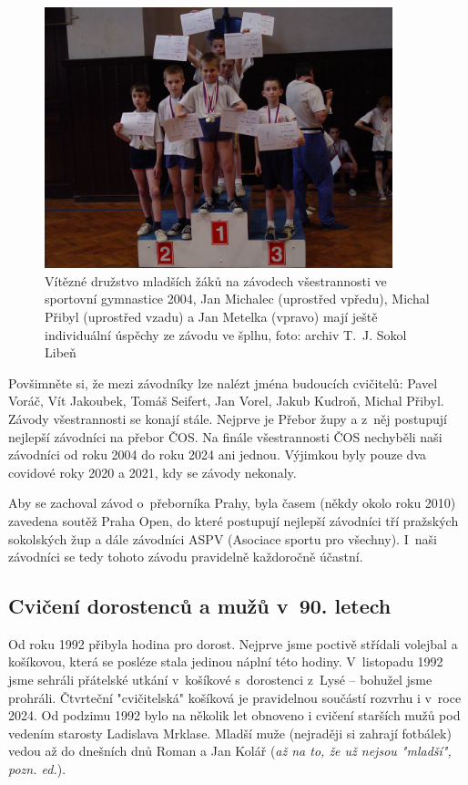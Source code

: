 \documentclass[a5paper, 11pt, twoside]{article}
\begin{document}
\begin{figure}[h!]
  \centering 
  \includegraphics[width=0.9\textwidth]{img/42_vitezove_gumnastika.JPG}
  \caption*{Vítězné družstvo mladších žáků na závodech všestrannosti ve
  sportovní gymnastice 2004, Jan Michalec (uprostřed vpředu), Michal
  Přibyl (uprostřed vzadu) a Jan Metelka (vpravo) mají ještě individuální
  úspěchy ze závodu ve šplhu, foto: archiv T.~J. Sokol Libeň}
\end{figure}

Povšimněte si, že mezi závodníky lze nalézt jména budoucích cvičitelů:
Pavel Voráč, Vít Jakoubek, Tomáš Seifert, Jan Vorel, Jakub Kudroň,
Michal Přibyl. Závody všestrannosti se konají stále. Nejprve je Přebor
župy a z~něj postupují nejlepší závodníci na přebor ČOS. Na finále
všestrannosti ČOS nechyběli naši závodníci od roku 2004 do roku 2024 ani
jednou. Výjimkou byly pouze dva covidové roky 2020 a 2021, kdy se závody
nekonaly.

Aby se zachoval závod o~přeborníka Prahy, byla časem (někdy okolo roku
2010) zavedena soutěž Praha Open, do které postupují nejlepší závodníci
tří pražských sokolských žup a dále závodníci ASPV (Asociace sportu pro
všechny). I~naši závodníci se tedy tohoto závodu pravidelně každoročně
účastní.

\subsection{Cvičení dorostenců a mužů v~90.
letech}

Od roku 1992 přibyla hodina pro dorost. Nejprve jsme poctivě střídali
volejbal a košíkovou, která se posléze stala jedinou náplní této hodiny.
V~listopadu 1992 jsme sehráli přátelské utkání v~košíkové s~dorostenci
z~Lysé -- bohužel jsme prohráli. Čtvrteční "cvičitelská" košíková je
pravidelnou součástí rozvrhu i v~roce 2024. Od podzimu 1992 bylo na
několik let obnoveno i cvičení starších mužů pod vedením starosty
Ladislava Mrklase. Mladší muže (nejraději si zahrají fotbálek) vedou až
do dnešních dnů Roman a Jan Kolář (\textit{až na to, že už nejsou
"mladší", pozn. ed.}).
\end{document}
